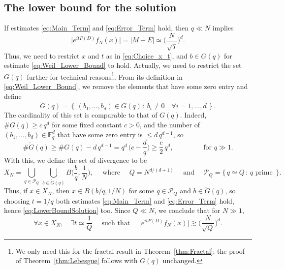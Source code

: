 \documentclass[11pt,reqno]{amsart}
\theoremstyle{definition}
\numberwithin{equation}{section}
\theoremstyle{remark}
\begin{document}
\subsection*{The lower bound for the solution}
If estimates \eqref{eq:Main_Term} and \eqref{eq:Error_Term} hold, 
then $q \ll N$ implies
\begin{equation}\label{eq:LowerBoundSolution}
    \big| e^{itP(D)}f_N(x) \big| 
    = |M + E| 
    \simeq \Big( \frac{N}{\sqrt{q}}\Big)^d.
\end{equation}
Thus, we need to restrict $x$ and $t$ as in \eqref{eq:Choice_x_t}, 
and $b \in G(q)$ for estimate \eqref{eq:Weil_Lower_Bound} to hold. 
Actually, we need to restrict the set $G(q)$ further for technical reasons\footnote{We only need this for the fractal result in Theorem~\ref{thm:Fractal}; the proof of Theorem~\ref{thm:Lebesgue} follows with $G(q)$ unchanged.}. 
From its definition in \eqref{eq:Weil_Lower_Bound}, we remove the elements that have some zero entry and define
\begin{equation}\label{eq:Restricted_Gq}
\widetilde{G}(q) 
=  \left\{ \, (b_1, \ldots, b_d) \in G(q) \, : \, b_i \neq 0 \quad \forall i = 1, \ldots, d 
\,   \right\}.   
\end{equation}
The cardinality of this set is comparable to that of $G(q)$. 
Indeed, $\# G(q) \geq c\, q^d$ for some fixed constant $c>0$,
and the number of $(b_1, \ldots, b_d) \in \mathbb F_q^d$ that have some zero entry is $\leq d\, q^{d-1}$, 
so 
\begin{equation}
    \#\widetilde{G}(q) \geq \#G(q) - d\, q^{d-1} 
    = q^d \, \Big( c - \frac{d}{q} \Big)
    \geq \frac{c}{2}\, q^d, 
    \qquad \qquad  \text{ for } q \gg 1. 
\end{equation}
With this, we define the set of divergence to be 
\begin{equation}\label{eq:Def_X_N}
    X_N = \bigcup_{q \in \mathcal P_Q} \, \bigcup_{b \in \widetilde{G}(q)} B\Big( \frac{b}{q}, \frac{1}{N} \Big), 
    \quad \text{ where } 
    \quad Q = N^{d/(d+1)}
    \quad \text{ and }
    \quad 
    \mathcal P_Q = \{ \, q \simeq Q \, : \, q \text{ prime }  \, \}.
\end{equation}
Thus, if $x \in X_N$, then $x \in B(b/q, 1/N)$ for some $q \in \mathcal P_Q$ and $b \in \widetilde{G}(q)$, 
so choosing $t = 1/q$ both estimates \eqref{eq:Main_Term} and \eqref{eq:Error_Term} hold, hence \eqref{eq:LowerBoundSolution} too. 
Since $Q \ll N$, we conclude that for $N \gg 1$, 
\begin{equation}\label{eq:Main_Estimate}
    \forall x \in X_N, \quad \exists t \simeq \frac{1}{Q} \quad 
    \text{ such that } 
    \quad
    \Big| e^{itP(D)}f_N(x) \Big|
    \gtrsim
    \Big(\frac{N}{\sqrt{Q}}\Big)^d.
\end{equation}
\end{document}
